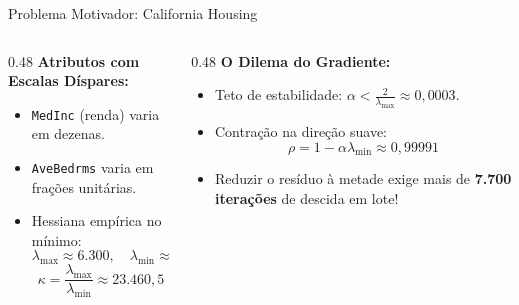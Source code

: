 \documentclass[aspectratio=169, 10pt]{beamer}
\begin{document}
\begin{frame}{Problema Motivador: California Housing}
  \begin{columns}[T]
    \begin{column}{0.48\textwidth}
      \textbf{Atributos com Escalas Díspares:}
      \begin{itemize}
        \item \texttt{MedInc} (renda) varia em dezenas.
        \item \texttt{AveBedrms} varia em frações unitárias.
        \item Hessiana empírica no mínimo:
        \[\lambda_{\max} \approx 6.300, \quad \lambda_{\min} \approx 0{,}27\]
        \[\kappa = \frac{\lambda_{\max}}{\lambda_{\min}} \approx 23.460{,}5\]
      \end{itemize}
    \end{column}
    \begin{column}{0.48\textwidth}
      \textbf{O Dilema do Gradiente:}
      \begin{itemize}
        \item Teto de estabilidade: $\alpha < \frac{2}{\lambda_{\max}} \approx 0{,}0003$.
        \item Contração na direção suave:
        \[\rho = 1 - \alpha \lambda_{\min} \approx 0{,}99991\]
        \item Reduzir o resíduo à metade exige mais de \textbf{7.700 iterações} de descida em lote!
      \end{itemize}
    \end{column}
  \end{columns}
\end{frame}
\end{document}
